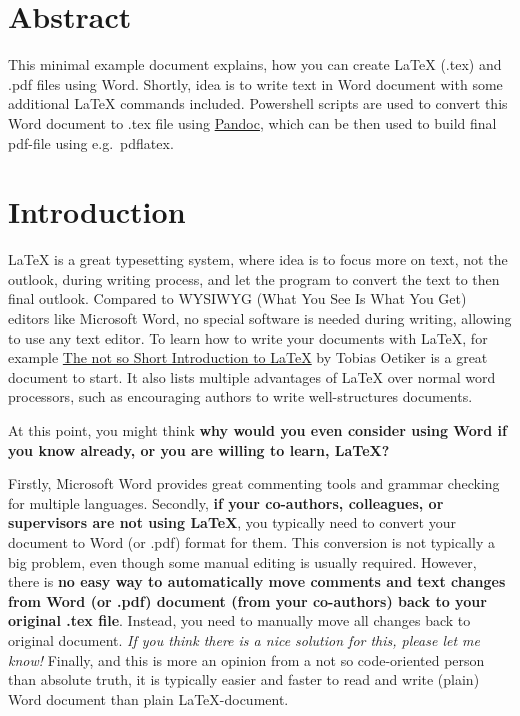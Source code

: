 \section*{Abstract}

This minimal example document explains, how you can create \LaTeX{} (.tex) and .pdf files using Word. Shortly, idea is
to write text in Word document with some additional \LaTeX{} commands included. Powershell scripts are used to convert
this Word document to .tex file using \href{https://pandoc.org/}{Pandoc}, which can be then used to build final pdf-file
using e.g.~pdflatex.

\section{Introduction}

\LaTeX{} is a great typesetting system, where idea is to focus more on text, not the outlook, during writing process,
and let the program to convert the text to then final outlook. Compared to WYSIWYG (What You See Is What You Get)
editors like Microsoft Word, no special software is needed during writing, allowing to use any text editor. To learn how
to write your documents with \LaTeX{}, for example
\href{https://www.ctan.org/tex-archive/info/lshort/english/}{The not so Short Introduction to \LaTeX{}} by Tobias
Oetiker is a great document to start. It also lists multiple advantages of \LaTeX{} over normal word processors, such as
encouraging authors to write well-structures documents.

At this point, you might think \textbf{why would you even consider using Word if you know already, or you are willing to
learn, \LaTeX{}?}

Firstly, Microsoft Word provides great commenting tools and grammar checking for multiple languages. Secondly,
\textbf{if your co-authors, colleagues, or supervisors are not using \LaTeX{}}, you typically need to convert your
document to Word (or .pdf) format for them. This conversion is not typically a big problem, even though some manual
editing is usually required. However, there is \textbf{no easy way to automatically move comments and text changes}
\textbf{from Word (or .pdf) document (from your co-authors) back to your original .tex file}. Instead, you need to
manually move all changes back to original document. \emph{If you think there is a nice solution for this, please let me
know!} Finally, and this is more an opinion from a not so code-oriented person than absolute truth, it is typically
easier and faster to read and write (plain) Word document than plain \LaTeX{}-document.

